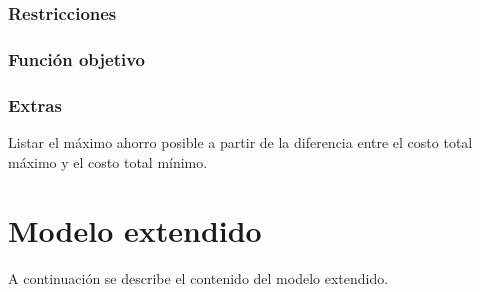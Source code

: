 \documentclass{article}
\begin{document}
\subsubsection{Restricciones}


\subsubsection{Función objetivo}

\subsubsection{Extras}
Listar el máximo ahorro posible a partir de la diferencia entre el costo total máximo y el costo total mínimo.

\section{Modelo extendido}
A continuación se describe el contenido del modelo extendido. \newline
\end{document}
